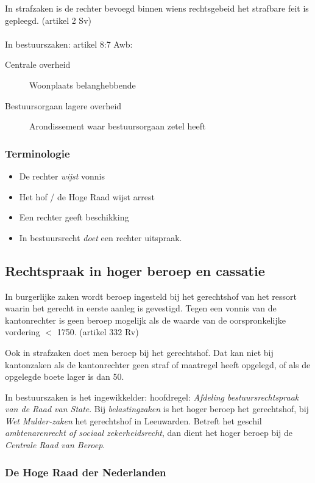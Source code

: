 \documentclass{article}
\begin{document}
In strafzaken is de rechter bevoegd binnen wiens rechtsgebeid het strafbare
feit is gepleegd. (artikel 2 Sv) 
\\\\
In bestuurszaken: artikel 8:7 Awb:
\begin{description}
  \item[Centrale overheid] Woonplaats belanghebbende
  \item[Bestuursorgaan lagere overheid] Arondissement waar bestuursorgaan zetel heeft
\end{description}

\subsubsection{Terminologie}
\begin{itemize}
  \item De rechter \emph{wijst} vonnis
  \item Het hof / de Hoge Raad wijst arrest
  \item Een rechter geeft beschikking
  \item In bestuursrecht \emph{doet} een rechter uitspraak.
\end{itemize}

\subsection{Rechtspraak in hoger beroep en cassatie}

In burgerlijke zaken wordt beroep ingesteld bij het gerechtshof van het 
ressort waarin het gerecht in eerste aanleg is gevestigd. Tegen een vonnis
van de kantonrechter is geen beroep mogelijk als de waarde van de oorspronkelijke 
vordering $<$ 1750. (artikel 332 Rv) 

Ook in strafzaken doet men beroep bij het gerechtshof. Dat kan niet bij
kantonzaken als de kantonrechter geen straf of maatregel heeft opgelegd, of als
de opgelegde boete lager is dan 50. 

In bestuurszaken is het ingewikkelder: hoofdregel: \emph{Afdeling bestuursrechtspraak
van de Raad van State}. Bij \emph{belastingzaken} is het hoger beroep het gerechtshof,
bij \emph{Wet Mulder-zaken} het gerechtshof in Leeuwarden. Betreft het geschil
\emph{ambtenarenrecht of sociaal zekerheidsrecht}, dan dient het hoger beroep bij de
\emph{Centrale Raad van Beroep}.

\subsubsection{De Hoge Raad der Nederlanden}
\end{document}
